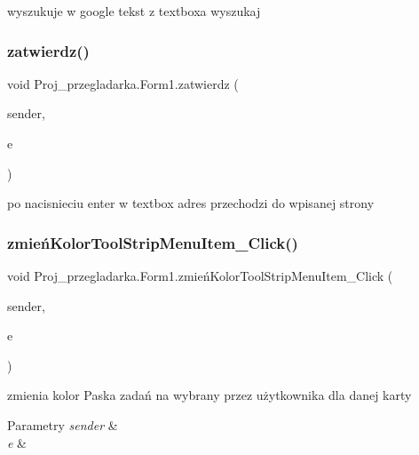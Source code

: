 wyszukuje w google tekst z textboxa wyszukaj 

\mbox{\label{class_proj__przegladarka_1_1_form1_ab7bc6e39d4950b8e2e37c6e4f7c1a02f}} 
\subsubsection{\texorpdfstring{zatwierdz()}{zatwierdz()}}
{\footnotesize\ttfamily void Proj\+\_\+przegladarka.\+Form1.\+zatwierdz (\begin{DoxyParamCaption}\item[{object}]{sender,  }\item[{Key\+Event\+Args}]{e }\end{DoxyParamCaption})}



po nacisnieciu enter w textbox adres przechodzi do wpisanej strony 

\mbox{\label{class_proj__przegladarka_1_1_form1_ad76d716c27e1c1dd47eb158d25437b96}} 
\subsubsection{\texorpdfstring{zmieńKolorToolStripMenuItem\_Click()}{zmieńKolorToolStripMenuItem\_Click()}}
{\footnotesize\ttfamily void Proj\+\_\+przegladarka.\+Form1.\+zmień\+Kolor\+Tool\+Strip\+Menu\+Item\+\_\+\+Click (\begin{DoxyParamCaption}\item[{object}]{sender,  }\item[{Event\+Args}]{e }\end{DoxyParamCaption})\hspace{0.3cm}{\ttfamily [private]}}



zmienia kolor Paska zadań na wybrany przez użytkownika dla danej karty 


\begin{DoxyParams}{Parametry}
{\em sender} & \\
\hline
{\em e} & \\
\hline
\end{DoxyParams}


